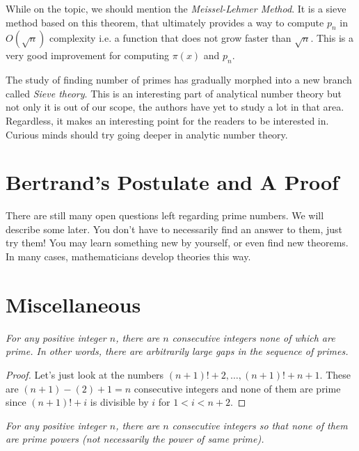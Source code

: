 \documentclass{subfiles}
\begin{document}
	While on the topic, we should mention the \textit{Meissel-Lehmer Method}. It is a sieve method based on this theorem, that ultimately provides a way to compute $p_n$ in $O(\sqrt{n})$ complexity i.e. a function that does not grow faster than $\sqrt{n}$. This is a very good improvement for computing $\pi(x)$ and $p_n$.
	\begin{note}
		The study of finding number of primes has gradually morphed into a new branch called \textit{Sieve theory}. This is an interesting part of analytical number theory but not only it is out of our scope, the authors have yet to study a lot in that area. Regardless, it makes an interesting point for the readers to be interested in. Curious minds should try going deeper in analytic number theory. 
	\end{note}
	
	\section{Bertrand's Postulate and A Proof}\label{sec:bertrand}
		
	There are still many open questions left regarding prime numbers. We will describe some later. You don't have to necessarily find an answer to them, just try them! You may learn something new by yourself, or even find new theorems. In many cases, mathematicians develop theories this way.
	
	\section{Miscellaneous}
	\label{sec:theoremsinprimes}
	
	\begin{theorem}\slshape
		For any positive integer $n$, there are $n$ consecutive integers none of which are prime. In other words, there are arbitrarily large gaps in the sequence of primes.
	\end{theorem}
	
	\begin{proof}
		Let's just look at the numbers $(n+1)!+2,\ldots,(n+1)!+n+1$. These are $(n+1)-(2)+1=n$ consecutive integers and none of them are prime since $(n+1)!+i$ is divisible by $i$ for $1<i<n+2$.
	\end{proof}
	
	\begin{theorem}\slshape
		For any positive integer $n$, there are $n$ consecutive integers so that none of them are prime powers (not necessarily the power of same prime).
	\end{theorem}
	
\end{document}
